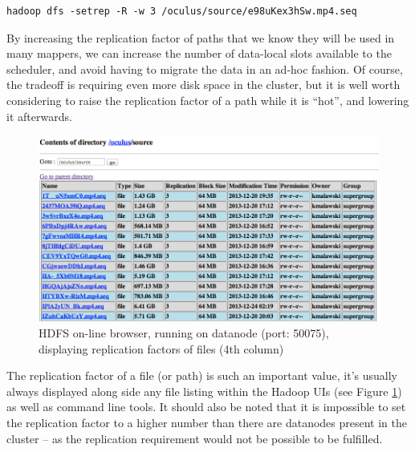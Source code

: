 \begin{lstlisting}[caption={Explicitly changing the replication factor on a path using command line tools}, label={lst:cli-change-replication}]
hadoop dfs -setrep -R -w 3 /oculus/source/e98uKex3hSw.mp4.seq
\end{lstlisting}

By increasing the replication factor of paths that we know they will be used in many mappers, we can increase the number of data-local slots available to the scheduler, and avoid having to migrate the data in an ad-hoc fashion. Of course, the tradeoff is requiring even more disk space in the cluster, but it is well worth considering to raise the replication factor of a path while it is ``hot'', and lowering it afterwards.

\begin{figure}
  \centering
  \includegraphics[width=\textwidth]{img/hadoop/hdfs_show-replication}
  \caption{HDFS on-line browser, running on datanode (port: 50075), displaying replication factors of files (4th column)}
    \label{fig:hdfs-replication-factors}
\end{figure}

The replication factor of a file (or path) is such an important value, it's usually always displayed along side any file listing within the Hadoop UIs (see Figure \ref{fig:hdfs-replication-factors}) as well as command line tools. It should also be noted that it is impossible to set the replication factor to a higher number than there are datanodes present in the cluster -- as the replication requirement would not be possible to be fulfilled.



